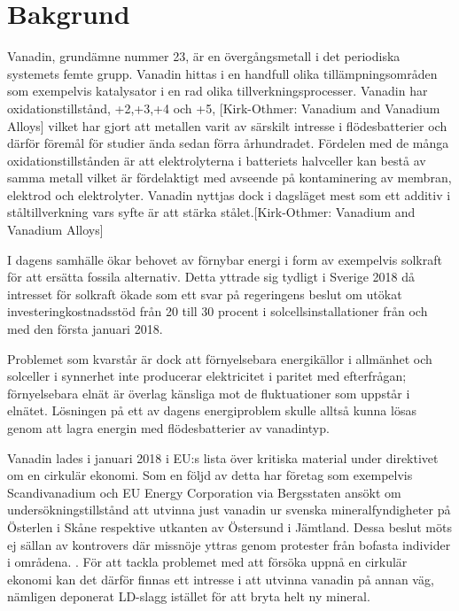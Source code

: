 \documentclass{article}
\begin{document}
\begin{centering}
\end{centering}
\newpage
\thispagestyle{empty}
\thispagestyle{empty}
\tableofcontents
\thispagestyle{empty}
\newpage
{}

\section{Bakgrund}
Vanadin, grundämne nummer 23, är en övergångsmetall i det periodiska systemets femte grupp. Vanadin hittas i en handfull olika tillämpningsområden som exempelvis katalysator i en rad olika tillverkningsprocesser\cite{Pecoraro2014}.
Vanadin har oxidationstillstånd, +2,+3,+4 och +5, [Kirk-Othmer: Vanadium and Vanadium Alloys] vilket har gjort att metallen varit av särskilt intresse i flödesbatterier och därför föremål för studier ända sedan förra århundradet\cite{Skyllas-Kazacos1987}.
Fördelen med de många oxidationstillstånden är att elektrolyterna i batteriets halvceller kan bestå av samma metall vilket är fördelaktigt med avseende på kontaminering av membran, elektrod och elektrolyter\cite{Lopez-Vizcaino2017}. 
Vanadin nyttjas dock i dagsläget mest som ett additiv i ståltillverkning vars syfte är att stärka stålet.[Kirk-Othmer: Vanadium and Vanadium Alloys] 

I dagens samhälle ökar behovet av förnybar energi i form av exempelvis solkraft för att ersätta fossila alternativ. Detta yttrade sig tydligt i Sverige 2018 då intresset för solkraft ökade som ett svar på regeringens beslut om utökat investeringkostnadsstöd från 20 till 30 procent i solcellsinstallationer från och med den första januari 2018\cite{SverigesEnergimybn2009}.

Problemet som kvarstår är dock att förnyelsebara energikällor i allmänhet och solceller i synnerhet inte producerar elektricitet i paritet med efterfrågan; förnyelsebara elnät är överlag känsliga mot de fluktuationer som uppstår i elnätet. Lösningen på ett av dagens energiproblem skulle alltså kunna lösas genom att lagra energin med flödesbatterier av vanadintyp\cite{Lopez-Vizcaino2017}.


Vanadin lades i januari 2018 i EU:s lista över kritiska material under direktivet om en cirkulär ekonomi\cite{Navigation2018}. 
Som en följd av detta har företag som exempelvis Scandivanadium och EU Energy Corporation via Bergsstaten ansökt om undersökningstillstånd att utvinna just vanadin ur svenska mineralfyndigheter på Österlen i Skåne respektive utkanten av Östersund i Jämtland. Dessa beslut möts ej sällan av kontrovers där missnöje yttras genom protester från bofasta individer i områdena. \cite{NohrstedtLinda2018GruvforetagBatterier}. 
För att tackla problemet med att försöka uppnå en cirkulär ekonomi kan det därför finnas ett intresse i att utvinna vanadin på annan väg, nämligen deponerat LD-slagg istället för att bryta helt ny mineral.
\end{document}
